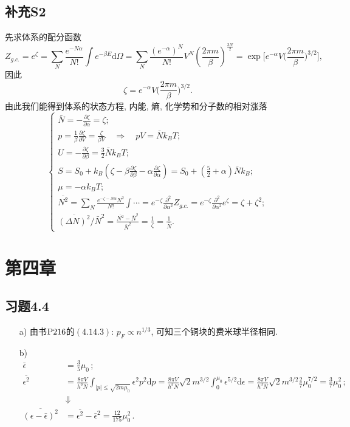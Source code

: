 \documentclass[letterpaper, 10pt]{article}
\newcommand{\dd}{\mathrm{d}}
\begin{document}
\subsection{补充S2}
先求体系的配分函数
\[ Z_{g.c.} = e^{\zeta} = \sum_{N} \frac{e^{-N\alpha}}{N!} \int e^{-\beta E} \dd \Omega = 
\sum_{N} \frac{(e^{-\alpha})^N}{N!} V^N \left( \frac{2\pi m}{\beta} \right)^{\frac{3N}{2}} =
\exp\bigg[ e^{-\alpha} V \Big( \frac{2\pi m}{\beta} \Big)^{3/2} \bigg], \]
因此
\[ \zeta = e^{-\alpha} V \Big( \frac{2\pi m}{\beta} \Big)^{3/2}. \]
由此我们能得到体系的状态方程, 内能, 熵, 化学势和分子数的相对涨落
\[\begin{cases}
\bar{N} = - \frac{\partial \zeta}{\partial \alpha} = \zeta;\\
p = \frac{1}{\beta} \frac{\partial \zeta}{\partial V} = \frac{\zeta}{\beta V} \quad{} \Rightarrow \quad{} pV = \bar{N} k_{B} T;\\
U = - \frac{\partial \zeta}{\partial \beta} = \frac{3}{2} \bar{N} k_{B} T;\\
S = S_{0} + k_{B} \left( \zeta - \beta \frac{\partial \zeta}{\partial \beta} - \alpha \frac{\partial \zeta}{\partial \alpha} \right) = S_{0} + \left( \frac{5}{2} + \alpha \right) \bar{N} k_{B};\\
\mu = -\alpha k_{B} T;\\
\overline{N^2} = \sum_{N} \frac{e^{-\zeta-N\alpha}N^2}{N!} \int \cdots = e^{-\zeta} \frac{\partial^2}{\partial \alpha^2} Z_{g.c.} = 
e^{-\zeta} \frac{\partial^2}{\partial \alpha^2} e^{\zeta} = \zeta + \zeta^2;\\
\overline{(\Delta N)^2} / \bar{N}^2 = \frac{\overline{N^2}-\bar{N}^2}{\bar{N}^2} = \frac{1}{\zeta} = \frac{1}{\bar{N}}.
\end{cases}\]

\newpage
\section{第四章}

\subsection{习题4.4}
\begin{itemize}
	\item[a)]
	由书${\rm P}216$的$(4.14.3)$: $p_{F} \propto n^{1/3}$, 可知三个铜块的费米球半径相同.
	\item[b)]
	\begin{align*}
	\bar{\epsilon} & = \frac{3}{5} \mu_{0} \,; \\
	\overline{\epsilon^2} & = \frac{8 \pi V}{h^3 N} \int_{|p| \leq \sqrt{2m\mu_{0}}} \epsilon^2 p^2 \dd p 
	= \frac{8 \pi V}{h^3 N} \sqrt{2} m^{3/2} \int_{0}^{\mu_{0}} \epsilon^{5/2} \dd \epsilon 
	= \frac{8 \pi V}{h^3 N} \sqrt{2} m^{3/2} \frac{2}{7} \mu_{0}^{7/2} = \frac{3}{7} \mu_{0}^{2} \,; \\
	& \Downarrow \\
	\overline{(\epsilon-\bar{\epsilon})^2} & = \overline{\epsilon^2} - \bar{\epsilon}^2 = \frac{12}{175} \mu_{0}^2 \,.
	\end{align*}
\end{itemize}
\end{document}
